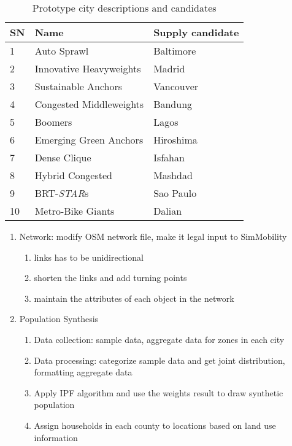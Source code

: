 \documentclass[11pt,twoside]{article}
\numberwithin{equation}{section}
\newcommand{\?}{\stackrel{?}{=}}
\begin{document}
\begin{table}[h!]
  \centering
  \begin{tabular}{l l l}\toprule
    \bf SN &\bf Name &\bf Supply candidate \\\midrule
    1 & Auto Sprawl & Baltimore \\
    2 & Innovative Heavyweights & Madrid \\
    3 & Sustainable Anchors & Vancouver \\
    4 & Congested Middleweights & Bandung \\
    5 & Boomers & Lagos \\
    6 & Emerging Green Anchors & Hiroshima \\
    7 & Dense Clique & Isfahan\\
    8 & Hybrid Congested & Mashdad \\
    9 & BRT-{\it STAR}s & Sao Paulo  \\
    10 & Metro-Bike Giants & Dalian \\ \bottomrule
  \end{tabular}
  \caption{Prototype city descriptions and candidates}
  \label{tab:proto}
\end{table}


\begin{enumerate}[Step 1:]
\item Network: modify OSM network file, make it legal input to SimMobility
  \begin{enumerate}[1.]
  \item links has to be unidirectional
  \item shorten the links and add turning points
  \item maintain the attributes of each object in the network
  \end{enumerate}
\item Population Synthesis
  \begin{enumerate}[1.]
  \item Data collection: sample data, aggregate data for zones in each city
  \item Data processing: categorize sample data and get joint distribution, formatting aggregate data
  \item Apply IPF algorithm and use the weights result to draw synthetic population
  \item Assign households in each county to locations based on land use information
  \end{enumerate} 
\end{enumerate}
\end{document}
